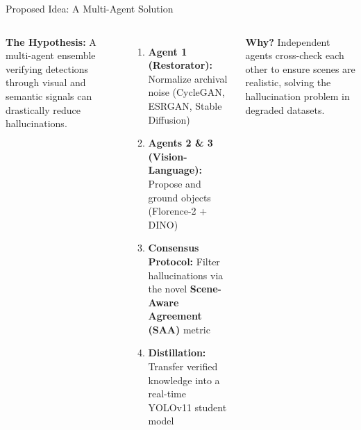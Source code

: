 \documentclass[aspectratio=169, 10pt]{beamer}
\begin{document}
\begin{frame}{Proposed Idea: A Multi-Agent Solution}
    \begin{columns}
        \textbf{The Hypothesis:}
        A multi-agent ensemble verifying detections through visual and semantic signals can drastically reduce hallucinations.
        \vspace{0.3cm}
        \begin{enumerate}
            \item \textbf{Agent 1 (Restorator):} Normalize archival noise (CycleGAN, ESRGAN, Stable Diffusion)
            \item \textbf{Agents 2 \& 3 (Vision-Language):} Propose and ground objects (Florence-2 + DINO)
            \item \textbf{Consensus Protocol:} Filter hallucinations via the novel \textbf{Scene-Aware Agreement (SAA)} metric
            \item \textbf{Distillation:} Transfer verified knowledge into a real-time YOLOv11 student model
        \end{enumerate}
        \vspace{0.3cm}
        \textbf{Why?} Independent agents cross-check each other to ensure scenes are realistic, solving the hallucination problem in degraded datasets.

        \centering
    
    \end{columns}
\end{frame}
\end{document}
